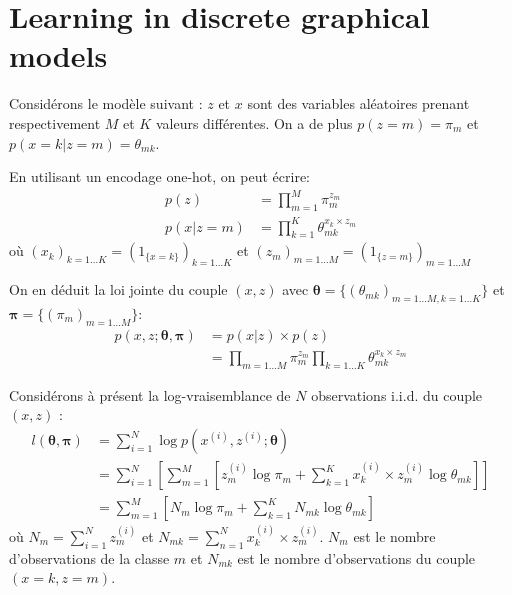 \documentclass{article}
\begin{document}
\maketitle

\section{Learning in discrete graphical models}

Considérons le modèle suivant : $z$ et $x$ sont des variables aléatoires prenant respectivement $M$ et $K$ valeurs différentes. On a de plus $p(z=m)=\pi_m$ et $p(x=k|z=m)=\theta_{mk}$.

En utilisant un encodage one-hot, on peut écrire:
\begin{align*}
p(z) &= \prod_{m=1}^M \pi_m^{z_m} \\
p(x|z=m) &= \prod_{k=1}^K \theta_{mk}^{x_k \times z_m}
\end{align*}
où $(x_k)_{k=1\ldots K} = (1_{\{x=k\}})_{k=1\ldots K}$ et $(z_m)_{m=1\ldots M} = (1_{\{z=m\}})_{m=1\ldots M}$

On en déduit la loi jointe du couple $(x,z)$ avec $\mathbf{\theta} = \{(\theta_{mk})_{m=1\ldots M, k=1\ldots K}\}$ et $\mathbf{\pi} = \{(\pi_m)_{m=1\ldots M}\}$:
\begin{align*}
p(x, z; \mathbf{\theta}, \mathbf{\pi}) &= p(x|z)\times p(z)\\
	&= \prod_{m=1\ldots M} \pi_m^{z_m} \prod_{k=1\ldots K} \theta_{mk}^{x_k \times z_m}
\end{align*}

Considérons à présent la log-vraisemblance de $N$ observations i.i.d. du couple $(x,z)$ :
\begin{align*}
l(\mathbf{\theta}, \mathbf{\pi}) &= \sum_{i=1}^N \log p(x^{(i)}, z^{(i)};\mathbf{\theta})\\
	&= \sum_{i=1}^N \left[ \sum_{m=1}^M \left[ z_m^{(i)} \log \pi_m + \sum_{k=1}^K x_k^{(i)} \times z_m^{(i)} \log \theta_{mk} \right] \right]\\
	&= \sum_{m=1}^M \left[ N_m \log \pi_m + \sum_{k=1}^K N_{mk} \log \theta_{mk} \right] 
\end{align*}
où $N_m = \sum_{i=1}^N z_m^{(i)}$ et $N_{mk} = \sum_{n=1}^N x_k^{(i)} \times z_m^{(i)}$. $N_m$ est le nombre d'observations de la classe $m$ et $N_{mk}$ est le nombre d'observations du couple $(x=k, z=m)$.
\end{document}

